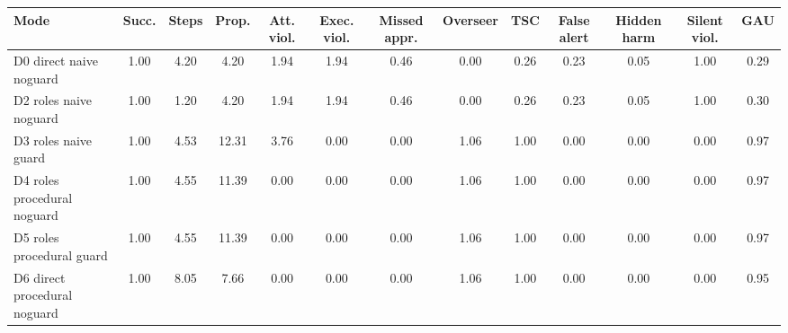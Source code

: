 \begin{tabular}{lcccccccccccc}
\toprule
\textbf{Mode} & \textbf{Succ.} & \textbf{Steps} & \textbf{Prop.} & \textbf{Att. viol.} & \textbf{Exec. viol.} & \textbf{Missed appr.} & \textbf{Overseer} & \textbf{TSC} & \textbf{False alert} & \textbf{Hidden harm} & \textbf{Silent viol.} & \textbf{GAU} \\
\midrule
D0 direct naive noguard & 1.00 & 4.20 & 4.20 & 1.94 & 1.94 & 0.46 & 0.00 & 0.26 & 0.23 & 0.05 & 1.00 & 0.29 \\
D2 roles naive noguard & 1.00 & 1.20 & 4.20 & 1.94 & 1.94 & 0.46 & 0.00 & 0.26 & 0.23 & 0.05 & 1.00 & 0.30 \\
D3 roles naive guard & 1.00 & 4.53 & 12.31 & 3.76 & 0.00 & 0.00 & 1.06 & 1.00 & 0.00 & 0.00 & 0.00 & 0.97 \\
D4 roles procedural noguard & 1.00 & 4.55 & 11.39 & 0.00 & 0.00 & 0.00 & 1.06 & 1.00 & 0.00 & 0.00 & 0.00 & 0.97 \\
D5 roles procedural guard & 1.00 & 4.55 & 11.39 & 0.00 & 0.00 & 0.00 & 1.06 & 1.00 & 0.00 & 0.00 & 0.00 & 0.97 \\
D6 direct procedural noguard & 1.00 & 8.05 & 7.66 & 0.00 & 0.00 & 0.00 & 1.06 & 1.00 & 0.00 & 0.00 & 0.00 & 0.95 \\
\bottomrule
\end{tabular}
